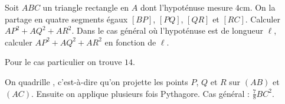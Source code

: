 \begin{exo}
Soit $ABC$ un triangle rectangle en $A$ dont l'hypoténuse mesure $4$cm.
On la partage en quatre segments égaux $[BP]$, $[PQ]$, $[QR]$ et $[RC]$.
Calculer $AP^2+AQ^2+AR^2$.
Dans le cas général où l'hypoténuse est de longueur $\ell$, calculer $AP^2+AQ^2+AR^2$ en fonction de $\ell$.
\begin{center}
\end{center}
\begin{hint}
Pour le cas particulier on trouve $14$.
\end{hint}
\begin{sol}
On \og quadrille \fg{}, c'est-à-dire qu'on projette les points $P$, $Q$ et $R$ sur $(AB)$ et $(AC)$. Ensuite on applique plusieurs fois Pythagore.
Cas général : $\frac{7}{8}BC^2$.
\end{sol}
\end{exo}





